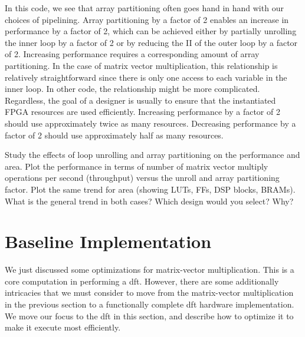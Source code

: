In this code, we see that array partitioning often goes hand in hand with our choices of pipelining. Array partitioning by a factor of 2 enables an increase in performance by a factor of 2, which can be achieved either by partially unrolling the inner loop by a factor of 2 or by reducing the II of the outer loop by a factor of 2.  Increasing performance requires a corresponding amount of array partitioning.  In the case of matrix vector multiplication, this relationship is relatively straightforward since there is only one access to each variable in the inner loop.  In other code, the relationship might be more complicated.  Regardless, the goal of a designer is usually to ensure that the instantiated FPGA resources are used efficiently.  Increasing performance by a factor of 2 should use approximately twice as many resources.  Decreasing performance by a factor of 2 should use approximately half as many resources.

\begin{exercise}
Study the effects of loop unrolling and array partitioning on the performance and area. Plot the performance in terms of number of matrix vector multiply operations per second (throughput) versus the unroll and array partitioning factor. Plot the same trend for area (showing LUTs, FFs, DSP blocks, BRAMs). What is the general trend in both cases? Which design would you select? Why?
\end{exercise} 


\section{Baseline Implementation}
\label{subsec:dft_implementation}

We just discussed some optimizations for matrix-vector multiplication. This is a core computation in performing a \gls{dft}. However, there are some additionally intricacies that we must consider to move from the matrix-vector multiplication in the previous section to a functionally complete \gls{dft} hardware implementation. We move our focus to the \gls{dft} in this section, and describe how to optimize it to make it execute most efficiently.  

